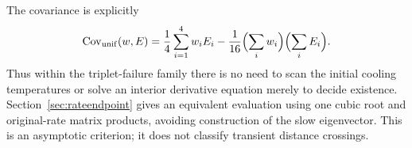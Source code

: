 The covariance is explicitly
\[
\operatorname{Cov}_{\mathrm{unif}}(w,E)
=\frac14\sum_{i=1}^4w_iE_i
-\frac1{16}\Bigl(\sum_iw_i\Bigr)\Bigl(\sum_iE_i\Bigr).
\]
Thus within the triplet-failure family there is no need to scan the initial
cooling temperatures or solve an interior derivative equation merely to
decide existence. Section~\ref{sec:rateendpoint} gives an equivalent
evaluation using one cubic root and original-rate matrix products,
avoiding construction of the slow eigenvector. This is an asymptotic
criterion; it does not classify transient distance crossings.
